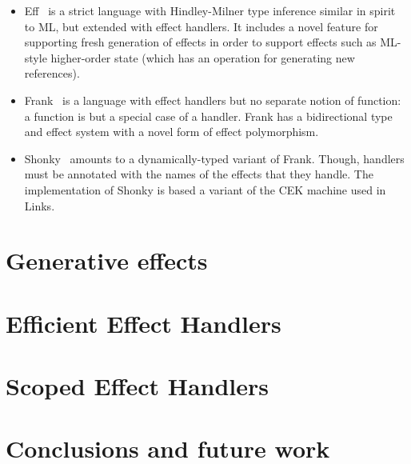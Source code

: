 \documentclass[letterpaper,10pt]{article}
\begin{document}
\begin{itemize}
\item Eff~\cite{BauerP15} is a strict language with Hindley-Milner
  type inference similar in spirit to ML, but extended with effect
  handlers.
%
  It includes a novel feature for supporting fresh generation of
  effects in order to support effects such as ML-style higher-order
  state (which has an operation for generating new references).

\item Frank~\cite{LindleyMM16} is a language with effect handlers but
  no separate notion of function: a function is but a special case of
  a handler. Frank has a bidirectional type and effect system with a
  novel form of effect polymorphism.
  

\item Shonky~\cite{McBride16} amounts to a dynamically-typed variant
  of Frank. Though, handlers must be annotated with the names of the
  effects that they handle. The implementation of Shonky is based a
  variant of the CEK machine used in Links.
\end{itemize}

\section{Generative effects}

\section{Efficient Effect Handlers}

\section{Scoped Effect Handlers}

\section{Conclusions and future work}

\nocite{*}


\end{document}
